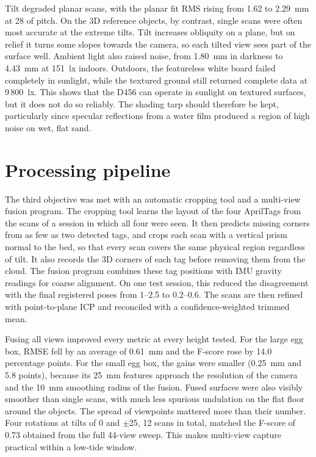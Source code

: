 Tilt degraded planar scans, with the planar fit RMS rising from 1.62 to 2.29~mm at 28\textdegree{} of pitch. On the 3D reference objects, by contrast, single scans were often most accurate at the extreme tilts. Tilt increases obliquity on a plane, but on relief it turns some slopes towards the camera, so each tilted view sees part of the surface well. Ambient light also raised noise, from 1.80~mm in darkness to 4.43~mm at 151~lx indoors. Outdoors, the featureless white board failed completely in sunlight, while the textured ground still returned complete data at 9\,800~lx. This shows that the D456 can operate in sunlight on textured surfaces, but it does not do so reliably. The shading tarp should therefore be kept, particularly since specular reflections from a water film produced a region of high noise on wet, flat sand.

\section*{Processing pipeline}

The third objective was met with an automatic cropping tool and a multi-view fusion program. The cropping tool learns the layout of the four AprilTags from the scans of a session in which all four were seen. It then predicts missing corners from as few as two detected tags, and crops each scan with a vertical prism normal to the bed, so that every scan covers the same physical region regardless of tilt. It also records the 3D corners of each tag before removing them from the cloud. The fusion program combines these tag positions with IMU gravity readings for coarse alignment. On one test session, this reduced the disagreement with the final registered poses from 1--2.5\textdegree{} to 0.2--0.6\textdegree{}. The scans are then refined with point-to-plane ICP and reconciled with a confidence-weighted trimmed mean.

Fusing all views improved every metric at every height tested. For the large egg box, RMSE fell by an average of 0.61~mm and the F-score rose by 14.0 percentage points. For the small egg box, the gains were smaller (0.25~mm and 5.8 points), because its 25~mm features approach the resolution of the camera and the 10~mm smoothing radius of the fusion. Fused surfaces were also visibly smoother than single scans, with much less spurious undulation on the flat floor around the objects. The spread of viewpoints mattered more than their number. Four rotations at tilts of 0 and $\pm$25\textdegree{}, 12 scans in total, matched the F-score of 0.73 obtained from the full 44-view sweep. This makes multi-view capture practical within a low-tide window.

